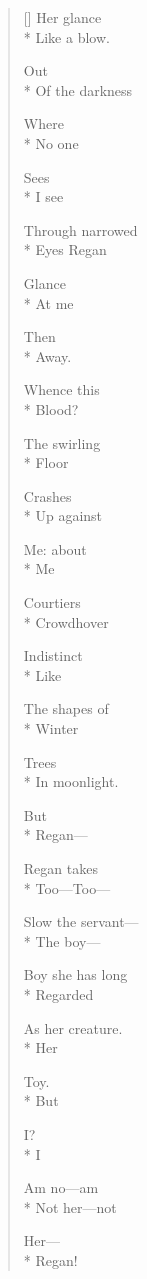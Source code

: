 \label{ch:lear_ar}
\begin{verse}[\versewidth]
 \qquad Her glance\\*
Like a blow.

\qquad \qquad Out\\*
Of the darkness

Where\\*
No one

Sees\\*
I see

Through narrowed\\*
Eyes Regan

Glance\\*
At me

\qquad \qquad Then\\*
Away.

\hspace*{3\vgap} Whence this\\*
Blood?

The swirling\\*
Floor

Crashes\\*
Up against

Me: about\\*
Me

Courtiers\\*
Crowd\qquad \qquad hover

Indistinct\\*
\qquad \qquad Like

The shapes of\\*
Winter

Trees\\*
In moonlight.

\qquad \qquad But\\*
Regan---

Regan takes\\*
Too---Too---

Slow the servant---\\*
The boy---

Boy she has long\\*
Regarded

As her creature.\\*
Her

Toy.\\*
But

I?\\*
I

Am no---am\\*
Not her---not

Her---\\*
\qquad Regan!
\end{verse}
